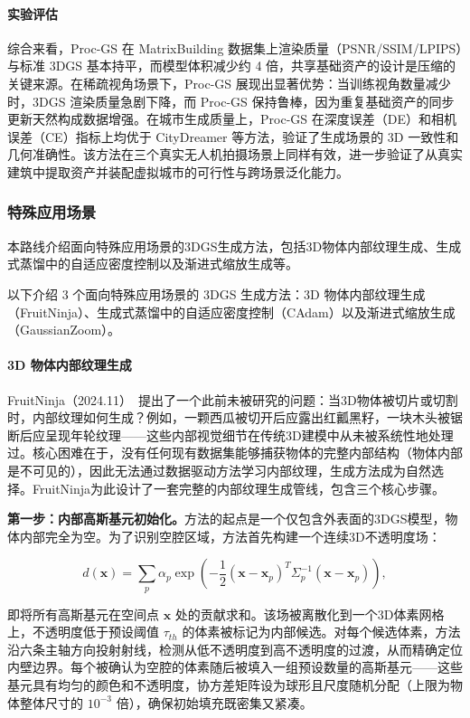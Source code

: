 \paragraph{实验评估}
综合来看，Proc-GS 在 MatrixBuilding 数据集上渲染质量（PSNR/SSIM/LPIPS）与标准 3DGS 基本持平，而模型体积减少约 4 倍，共享基础资产的设计是压缩的关键来源。在稀疏视角场景下，Proc-GS 展现出显著优势：当训练视角数量减少时，3DGS 渲染质量急剧下降，而 Proc-GS 保持鲁棒，因为重复基础资产的同步更新天然构成数据增强。在城市生成质量上，Proc-GS 在深度误差（DE）和相机误差（CE）指标上均优于 CityDreamer 等方法，验证了生成场景的 3D 一致性和几何准确性。该方法在三个真实无人机拍摄场景上同样有效，进一步验证了从真实建筑中提取资产并装配虚拟城市的可行性与跨场景泛化能力。

\subsubsection{特殊应用场景}

本路线介绍面向特殊应用场景的3DGS生成方法，包括3D物体内部纹理生成、生成式蒸馏中的自适应密度控制以及渐进式缩放生成等。

以下介绍 3 个面向特殊应用场景的 3DGS 生成方法：3D 物体内部纹理生成（FruitNinja）、生成式蒸馏中的自适应密度控制（CAdam）以及渐进式缩放生成（GaussianZoom）。

\paragraph{3D 物体内部纹理生成}

FruitNinja（2024.11）~\cite{2411_12089}提出了一个此前未被研究的问题：当3D物体被切片或切割时，内部纹理如何生成？例如，一颗西瓜被切开后应露出红瓤黑籽，一块木头被锯断后应呈现年轮纹理——这些内部视觉细节在传统3D建模中从未被系统性地处理过。核心困难在于，没有任何现有数据集能够捕获物体的完整内部结构（物体内部是不可见的），因此无法通过数据驱动方法学习内部纹理，生成方法成为自然选择。FruitNinja为此设计了一套完整的内部纹理生成管线，包含三个核心步骤。

\textbf{第一步：内部高斯基元初始化。}方法的起点是一个仅包含外表面的3DGS模型，物体内部完全为空。为了识别空腔区域，方法首先构建一个连续3D不透明度场：

\begin{equation}
d(\mathbf{x}) = \sum_p \alpha_p \exp\!\left(-\frac{1}{2}(\mathbf{x}-\mathbf{x}_p)^T\Sigma_p^{-1}(\mathbf{x}-\mathbf{x}_p)\right),
\end{equation}

即将所有高斯基元在空间点 $\mathbf{x}$ 处的贡献求和。该场被离散化到一个3D体素网格上，不透明度低于预设阈值 $\tau_{th}$ 的体素被标记为内部候选。对每个候选体素，方法沿六条主轴方向投射射线，检测从低不透明度到高不透明度的过渡，从而精确定位内壁边界。每个被确认为空腔的体素随后被填入一组预设数量的高斯基元——这些基元具有均匀的颜色和不透明度，协方差矩阵设为球形且尺度随机分配（上限为物体整体尺寸的 $10^{-3}$ 倍），确保初始填充既密集又紧凑。


